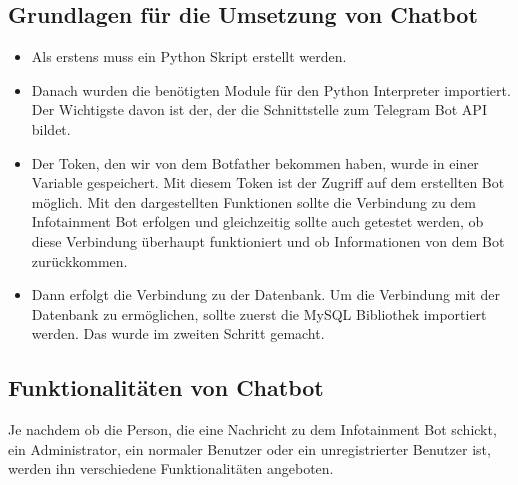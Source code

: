 \subsection{Grundlagen für die Umsetzung von Chatbot}
\begin{itemize}
	\item Als erstens muss ein Python Skript erstellt werden.
\end{itemize}
\begin{itemize}
	\item Danach wurden die benötigten Module für den Python Interpreter importiert.  Der Wichtigste davon ist der, der die Schnittstelle zum Telegram Bot API bildet.
\end{itemize}
\begin{itemize}
	\item Der Token, den wir von dem Botfather bekommen haben, wurde in einer Variable gespeichert. Mit diesem Token ist der Zugriff auf dem erstellten Bot möglich. Mit den dargestellten Funktionen sollte die Verbindung zu dem Infotainment Bot erfolgen und gleichzeitig sollte auch getestet werden, ob diese Verbindung überhaupt funktioniert und ob Informationen von dem Bot zurückkommen. 

\end{itemize}
\begin{itemize}
	\item Dann erfolgt die Verbindung zu der Datenbank. Um die Verbindung mit der Datenbank zu ermöglichen, sollte zuerst die MySQL Bibliothek importiert werden. Das wurde im zweiten Schritt gemacht. 
\end{itemize}
\subsection{Funktionalitäten von Chatbot}
Je nachdem ob die Person, die eine Nachricht zu dem Infotainment Bot schickt, ein Administrator, ein normaler Benutzer oder ein unregistrierter Benutzer ist, werden ihn verschiedene Funktionalitäten angeboten. 
